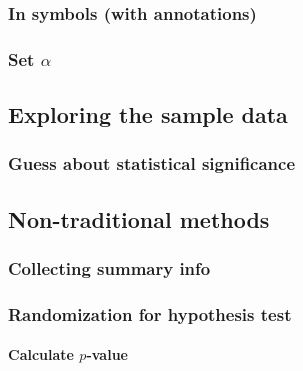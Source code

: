 \documentclass[12pt, krantz2,]{krantz}
\let\oldparagraph\paragraph
\renewcommand{\paragraph}[1]{\oldparagraph{#1}\mbox{}}
\begin{document}
\hypertarget{in-symbols-with-annotations-3}{%
\subsubsection*{In symbols (with annotations)}\label{in-symbols-with-annotations-3}}


\hypertarget{set-alpha-3}{%
\subsubsection*{\texorpdfstring{Set \(\alpha\)}{Set \textbackslash{}alpha}}\label{set-alpha-3}}


\hypertarget{exploring-the-sample-data-3}{%
\subsection{Exploring the sample data}\label{exploring-the-sample-data-3}}

\hypertarget{guess-about-statistical-significance-3}{%
\subsubsection*{Guess about statistical significance}\label{guess-about-statistical-significance-3}}


\hypertarget{non-traditional-methods-3}{%
\subsection{Non-traditional methods}\label{non-traditional-methods-3}}

\hypertarget{collecting-summary-info-1}{%
\subsubsection*{Collecting summary info}\label{collecting-summary-info-1}}


\hypertarget{randomization-for-hypothesis-test-1}{%
\subsubsection*{Randomization for hypothesis test}\label{randomization-for-hypothesis-test-1}}


\hypertarget{calculate-p-value-3}{%
\paragraph{\texorpdfstring{Calculate \(p\)-value}{Calculate p-value}}\label{calculate-p-value-3}}
\end{document}
